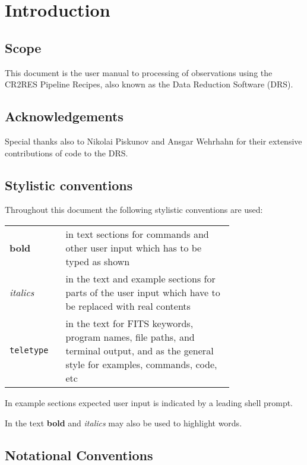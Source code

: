 \section{Introduction}
\label{sec:introduction}

\subsection{Scope}
\label{sec:scope}
This document is the user manual to processing of \instrument{}
observations using the CR2RES
Pipeline Recipes, also known as the \instrument{} Data Reduction Software 
(DRS).


\subsection{Acknowledgements}

Special thanks also to Nikolai Piskunov and Ansgar
Wehrhahn for their extensive contributions of code
to the DRS.

\subsection{Stylistic conventions}
\label{sec:style}

Throughout this document the following stylistic conventions are used:

\begin{tabular}{lp{0.75\linewidth}}
\textbf{bold}     & in text sections for commands and other
                    user input which has to be typed as shown \\
\textit{italics}  & in the text and example sections for parts of the user
                    input which have to be replaced with real contents \\
\texttt{teletype} & in the text for FITS keywords, program names, file paths,
                    and terminal output, and as the general style for examples,
                    commands, code, etc \\
\end{tabular}

In example sections expected user input is indicated by a leading shell
prompt.

In the text \textbf{bold} and \textit{italics} may also be used to highlight
words.

\subsection{Notational Conventions}
\label{sec:notation}


